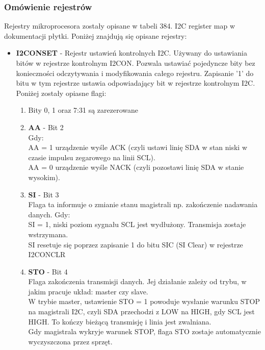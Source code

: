 \documentclass{article}
\begin{document}
\subsubsection{Omówienie rejestrów}
Rejestry mikroprocesora zostały opisane w tabeli 384. I2C register map w dokumentacji płytki. Poniżej znajdują się opisane rejestry:
\begin{itemize}
    \item \textbf{I2CONSET} - Rejestr ustawień kontrolnych I2C. Używany do ustawiania bitów w rejestrze kontrolnym I2CON. Pozwala ustawiać pojedyncze bity bez konieczności odczytywania i modyfikowania całego rejestru. Zapisanie '1' do bitu w tym rejestrze ustawia odpowiadający bit w rejestrze kontrolnym I2C. Poniżej zostały opiasne flagi:
    \begin{enumerate}
        \item Bity 0, 1 oraz 7:31 są zarezerowane 
        \item \textbf{AA} - Bit 2 \\
            Gdy:\\
            AA = 1 urządzenie wyśle ACK (czyli ustawi linię SDA w stan niski w czasie impulsu zegarowego na linii SCL). \\
            AA = 0 urządzenie wyśle NACK (czyli pozostawi linię SDA w stanie wysokim).
        \item \textbf{SI} - Bit 3 \\
            Flaga ta informuje o zmianie stanu magistrali np. zakończenie nadawania danych.
            Gdy:\\
            SI = 1, niski poziom sygnału SCL jest wydłużony. Transmisja zostaje wstrzymana.\\
            SI resetuje się poprzez zapisanie 1 do bitu SIC (SI Clear) w rejestrze I2CONCLR
        \item \textbf{STO} - Bit 4\\
            Flaga zakończenia transmisji danych. Jej działanie zależy od trybu, w jakim pracuje układ: master czy slave.\\
            W trybie master, ustawienie STO = 1 powoduje wysłanie warunku STOP na magistrali I2C, czyli SDA przechodzi z LOW na HIGH, gdy SCL jest HIGH. To kończy bieżącą transmisję i linia jest zwalniana.\\
            Gdy magistrala wykryje warunek STOP, flaga STO zostaje automatycznie wyczyszczona przez sprzęt.


\end{enumerate}
\end{itemize}
\end{document}
